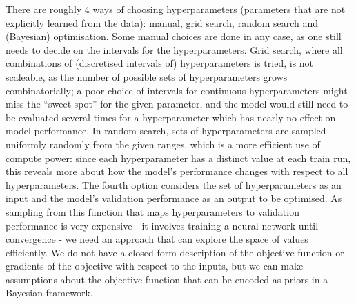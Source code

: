 There are roughly 4 ways of choosing hyperparameters (parameters that are not explicitly learned from the data): manual, grid search, random search and (Bayesian) optimisation.
Some manual choices are done in any case, as one still needs to decide on the intervals for the hyperparameters.
Grid search, where all combinations of (discretised intervals of) hyperparameters is tried, is not scaleable, as the number of possible sets of hyperparameters grows combinatorially; a poor choice of intervals for continuous hyperparameters might miss the ``sweet spot'' for the given parameter, and the model would still need to be evaluated several times for a hyperparameter which has nearly no effect on model performance.
In random search, sets of hyperparameters are sampled uniformly randomly from the given ranges, which is a more efficient use of compute power: since each hyperparameter has a distinct value at each train run, this reveals more about how the model's performance changes with respect to all hyperparameters.
The fourth option considers the set of hyperparameters as an input and the model's validation performance as an output to be optimised.
As sampling from this function that maps hyperparameters to validation performance is very expensive - it involves training a neural network until convergence - we need an approach that can explore the space of values efficiently.
We do not have a closed form description of the objective function or gradients of the objective with respect to the inputs, but we can make assumptions about the objective function that can be encoded as priors in a Bayesian framework.
